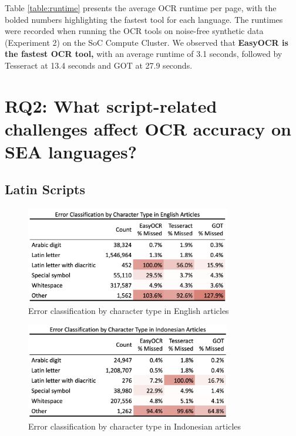 \documentclass[12pt,oneside]{memoir}
\begin{document}
Table \ref{table:runtime} presents the average OCR runtime per page, with the bolded numbers highlighting the fastest tool for each language. 
The runtimes were recorded when running the OCR tools on noise-free synthetic data (Experiment 2) on the SoC Compute Cluster. 
We observed that \textbf{EasyOCR is the fastest OCR tool,} with an average runtime of 3.1 seconds, followed by Tesseract at 13.4 seconds and GOT at 27.9 seconds.

\section{RQ2: What script-related challenges affect OCR accuracy on SEA languages?}

\subsection{Latin Scripts}

\begin{figure}[ht]
    \centering
    \includegraphics[width=0.8\textwidth]{images/error-classification-english.png}
    \caption{Error classification by character type in English articles}
    \label{figure:error-classification-english}
\end{figure}

\begin{figure}[ht]
    \centering
    \includegraphics[width=0.8\textwidth]{images/error-classification-indonesian.png}
    \caption{Error classification by character type in Indonesian articles}
    \label{figure:error-classification-indonesian}
\end{figure}
\end{document}
